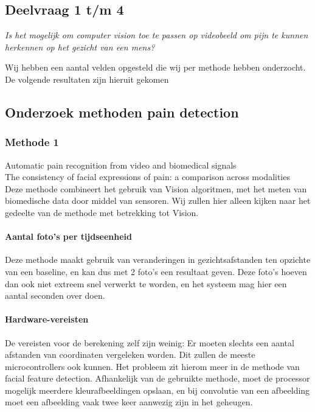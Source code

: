 \documentclass[11pt]{article}
\begin{document}
    \subsection{Deelvraag 1 t/m 4}\label{subsec:deelvraag-1-t/m-4}
    \emph{Is het mogelijk om computer vision toe te passen op videobeeld om pijn te kunnen herkennen op het gezicht van een mens?}

    Wij hebben een aantal velden opgesteld die wij per methode hebben onderzocht.
    De volgende resultaten zijn hieruit gekomen

    \subsection{Onderzoek methoden pain detection}\label{subsec:onderzoek-methoden-pain-detection}

    \subsubsection{Methode 1}

    \emph{\citet{werner2014automatic}} Automatic pain recognition from video and biomedical signals\\
    \emph{\citet{prkachin1992consistency}} The consistency of facial expressions of pain: a comparison across modalities\\
    Deze methode combineert het gebruik van Vision algoritmen, met het meten van biomedische data door middel van sensoren.
    Wij zullen hier alleen kijken naar het gedeelte van de methode met betrekking tot Vision.

    \paragraph{Aantal foto's per tijdseenheid}
    Deze methode maakt gebruik van veranderingen in gezichtsafstanden ten opzichte van een baseline, en kan dus met 2 foto's een resultaat geven.
    Deze foto's hoeven dan ook niet extreem snel verwerkt te worden, en het systeem mag hier een aantal seconden over doen.

    \paragraph{Hardware-vereisten}
    De vereisten voor de berekening zelf zijn weinig: Er moeten slechts een aantal afstanden van coordinaten vergeleken worden.
    Dit zullen de meeste microcontrollers ook kunnen.
    Het probleem zit hierom meer in de methode van facial feature detection.
    Afhankelijk van de gebruikte methode, moet de processor mogelijk meerdere kleurafbeeldingen opslaan, en bij convolutie van een afbeelding moet een afbeelding vaak twee keer aanwezig zijn in het geheugen.
    
\end{document}

